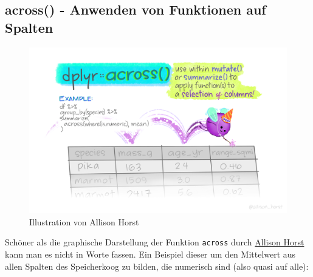 \documentclass[
]{article}
\begin{document}
\hypertarget{across---anwenden-von-funktionen-auf-spalten}{%
\subsection{across() - Anwenden von Funktionen auf Spalten}\label{across---anwenden-von-funktionen-auf-spalten}}

\begin{figure}

{\centering \includegraphics[width=1\linewidth]{images/043} 

}

\caption{Illustration von Allison Horst}\label{fig:unnamed-chunk-149}
\end{figure}

Schöner als die graphische Darstellung der Funktion \texttt{across} durch \href{https://twitter.com/allison_horst?lang=de}{Allison Horst} kann man es nicht in Worte fassen. Ein Beispiel dieser um den Mittelwert aus allen Spalten des Speicherkoog zu bilden, die numerisch sind (also quasi auf alle):
\end{document}
